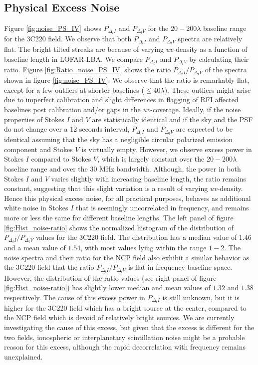 \documentclass[fleqn,usenatbib]{mnras}
\begin{document}
\subsection{Physical Excess Noise}\label{subsec:ExcessNoise}
Figure \ref{fig:noise_PS_IV} shows $P_{\Delta_t I}$ and $P_{\Delta_t V}$ for the $20-200 \lambda$ baseline range for the 3C220 field. We observe that both $P_{\Delta_t I}$ and $P_{\Delta_t V}$ spectra are relatively flat. The bright tilted streaks are because of varying $uv$-density as a function of baseline length in LOFAR-LBA. We compare $P_{\Delta_t I}$ and $P_{\Delta_t V}$ by calculating their ratio. Figure \ref{fig:Ratio_noise_PS_IV} shows the ratio $P_{\Delta_t I} / P_{\Delta_t V}$ of the spectra shown in figure \ref{fig:noise_PS_IV}. We observe that the ratio is remarkably flat, except for a few outliers at shorter baselines ($\leq 40 \lambda$). These outliers might arise due to imperfect calibration and slight differences in flagging of RFI affected baselines post calibration and/or gaps in the $uv$-coverage. Ideally, if the noise properties of Stokes $I$ and $V$ are statistically identical and if the sky and the PSF do not change over a 12 seconds interval, $P_{\Delta_{t} I}$ and $P_{\Delta_{t} V}$ are expected to be identical assuming that the sky has a negligible circular polarized emission component and Stokes $V$ is virtually empty. However, we observe excess power in Stokes $I$ compared to Stokes $V$, which is largely constant over the $20 - 200\lambda$ baseline range and over the 30 MHz bandwidth. Although, the power in both Stokes $I$ and $V$ varies slightly with increasing baseline length, the ratio remains constant, suggesting that this slight variation is a result of varying $uv$-density. Hence this physical excess noise, for all practical purposes, behaves as additional white noise in Stokes $I$ that is seemingly uncorrelated in frequency, and remains more or less the same for different baseline lengths. The left panel of figure \ref{fig:Hist_noise-ratio} shows the normalized histogram of the distribution of $P_{\Delta_t I} / P_{\Delta_t V}$ values for the 3C220 field. The distribution has a median value of $1.46$ and a mean value of $1.54$, with most values lying within the range $1-2$. The noise spectra and their ratio for the NCP field also exhibit a similar behavior as the 3C220 field that the ratio $P_{\Delta_t I} / P_{\Delta_t V}$ is flat in frequency-baseline space. However, the distribution of the ratio values (see right panel of figure \ref{fig:Hist_noise-ratio}) has slightly lower median and mean values of $1.32$ and $1.38$ respectively. The cause of this excess power in $P_{\Delta_t I}$ is still unknown, but it is higher for the 3C220 field which has a bright source at the center, compared to the NCP field which is devoid of relatively bright sources. We are currently investigating the cause of this excess, but given that the excess is different for the two fields, ionospheric or interplanetary scintillation noise might be a probable reason for this excess, although the rapid decorrelation with frequency remains unexplained.
\end{document}
